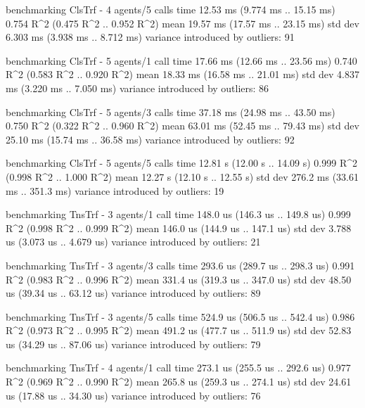 \begin{showCode}
benchmarking ClsTrf - 4 agents/5 calls
time                 12.53 ms   (9.774 ms .. 15.15 ms)
                     0.754 R^2   (0.475 R^2 .. 0.952 R^2)
mean                 19.57 ms   (17.57 ms .. 23.15 ms)
std dev              6.303 ms   (3.938 ms .. 8.712 ms)
variance introduced by outliers: 91%

benchmarking ClsTrf - 5 agents/1 call
time                 17.66 ms   (12.66 ms .. 23.56 ms)
                     0.740 R^2   (0.583 R^2 .. 0.920 R^2)
mean                 18.33 ms   (16.58 ms .. 21.01 ms)
std dev              4.837 ms   (3.220 ms .. 7.050 ms)
variance introduced by outliers: 86%

benchmarking ClsTrf - 5 agents/3 calls
time                 37.18 ms   (24.98 ms .. 43.50 ms)
                     0.750 R^2   (0.322 R^2 .. 0.960 R^2)
mean                 63.01 ms   (52.45 ms .. 79.43 ms)
std dev              25.10 ms   (15.74 ms .. 36.58 ms)
variance introduced by outliers: 92%

benchmarking ClsTrf - 5 agents/5 calls
time                 12.81 s    (12.00 s .. 14.09 s)
                     0.999 R^2   (0.998 R^2 .. 1.000 R^2)
mean                 12.27 s    (12.10 s .. 12.55 s)
std dev              276.2 ms   (33.61 ms .. 351.3 ms)
variance introduced by outliers: 19%

benchmarking TnsTrf - 3 agents/1 call
time                 148.0 us   (146.3 us .. 149.8 us)
                     0.999 R^2   (0.998 R^2 .. 0.999 R^2)
mean                 146.0 us   (144.9 us .. 147.1 us)
std dev              3.788 us   (3.073 us .. 4.679 us)
variance introduced by outliers: 21%

benchmarking TnsTrf - 3 agents/3 calls
time                 293.6 us   (289.7 us .. 298.3 us)
                     0.991 R^2   (0.983 R^2 .. 0.996 R^2)
mean                 331.4 us   (319.3 us .. 347.0 us)
std dev              48.50 us   (39.34 us .. 63.12 us)
variance introduced by outliers: 89%

benchmarking TnsTrf - 3 agents/5 calls
time                 524.9 us   (506.5 us .. 542.4 us)
                     0.986 R^2   (0.973 R^2 .. 0.995 R^2)
mean                 491.2 us   (477.7 us .. 511.9 us)
std dev              52.83 us   (34.29 us .. 87.06 us)
variance introduced by outliers: 79%

benchmarking TnsTrf - 4 agents/1 call
time                 273.1 us   (255.5 us .. 292.6 us)
                     0.977 R^2   (0.969 R^2 .. 0.990 R^2)
mean                 265.8 us   (259.3 us .. 274.1 us)
std dev              24.61 us   (17.88 us .. 34.30 us)
variance introduced by outliers: 76%


\end{showCode}
